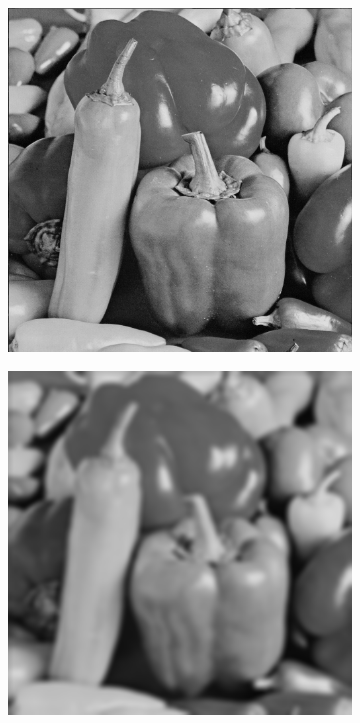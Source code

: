 \begin{figure}[htbp]
\begin{subfigure}[b]{0.2\textwidth}
    \vspace*{0.02\textwidth}
  \end{subfigure}%
  \hspace*{0.02\textwidth}
  \begin{subfigure}[b]{0.2\textwidth}
    \centering
    \includegraphics[width=\textwidth]{figs/method/fourier/peppers_original.png}
    \vspace*{0.02\textwidth}
  \end{subfigure}%
  \hspace*{0.02\textwidth}
  \begin{subfigure}[b]{0.2\textwidth}
    \centering
    \includegraphics[width=\textwidth]{figs/method/fourier/peppers_blur_original.png}

\end{subfigure}
\end{figure}
